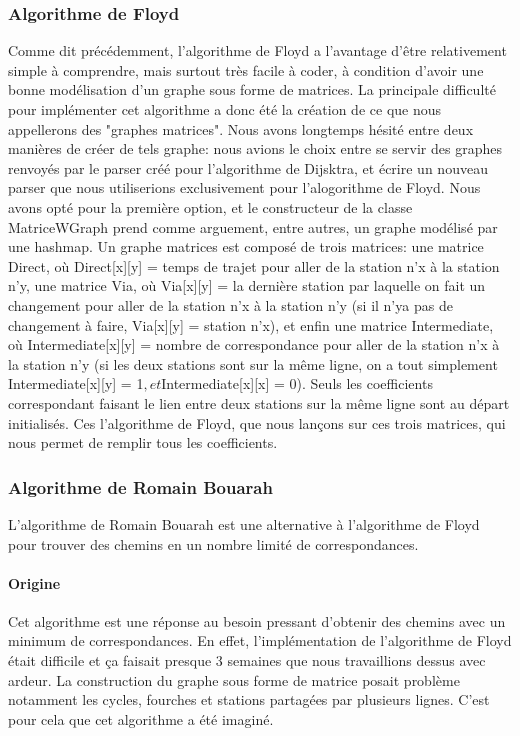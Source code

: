 \documentclass[french, 12pt]{article}
\begin{document}
\subsubsection{Algorithme de Floyd}
Comme dit précédemment, l'algorithme de Floyd a l'avantage d'être relativement simple à comprendre, mais surtout très facile à coder, à condition d'avoir une bonne modélisation d'un graphe sous forme de matrices.
La principale difficulté pour implémenter cet algorithme a donc été la création de ce que nous appellerons des "graphes matrices". Nous avons longtemps hésité entre deux manières de créer de tels graphe: nous avions le choix entre se servir des graphes 
renvoyés par le parser créé pour l'algorithme de Dijsktra, et écrire un nouveau parser que nous utiliserions exclusivement pour l'alogorithme de Floyd. Nous avons opté pour la première option, et le constructeur de la classe MatriceWGraph prend comme arguement, entre autres,
un graphe modélisé par une hashmap. Un graphe matrices est composé de trois matrices: une matrice Direct, où Direct[x][y] = temps de trajet pour aller de la station n'x à la station n'y, une matrice Via, où
Via[x][y] = la dernière station par laquelle on fait un changement pour aller de la station n'x à la station n'y (si il n'ya pas de changement à faire, Via[x][y] = station n'x), et enfin une matrice Intermediate, où
Intermediate[x][y] = nombre de correspondance pour aller de la station n'x à la station n'y (si les deux stations sont sur la même ligne, on a tout simplement Intermediate[x][y] = 1$, et $Intermediate[x][x] = 0).
Seuls les coefficients correspondant faisant le lien entre deux stations sur la même ligne sont au départ initialisés. Ces l'algorithme de Floyd, que nous lançons sur ces trois matrices, qui nous permet de remplir tous les coefficients.  

\subsubsection{Algorithme de Romain Bouarah}
L'algorithme de Romain Bouarah est une alternative à l'algorithme de Floyd pour trouver des chemins en un nombre limité de correspondances.

\paragraph{Origine}
Cet algorithme est une réponse au besoin pressant d'obtenir des chemins avec un minimum de correspondances.
En effet, l'implémentation de l'algorithme de Floyd était difficile et ça faisait presque 3 semaines que nous travaillions dessus avec ardeur.
La construction du graphe sous forme de matrice posait problème notamment les cycles, fourches et stations partagées par plusieurs lignes.
C'est pour cela que cet algorithme a été imaginé.
\end{document}
